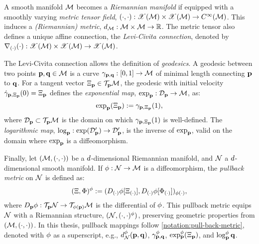 A smooth manifold \(\mathcal{M}\) becomes a \emph{Riemannian manifold} if equipped with a smoothly varying \emph{metric tensor field}, \((\cdot, \cdot): \mathscr{X}(\mathcal{M}) \times \mathscr{X}(\mathcal{M}) \to C^\infty(\mathcal{M})\). This induces a \emph{(Riemannian) metric}, \(d_{\mathcal{M}}: \mathcal{M} \times \mathcal{M} \to \mathbb{R}\). The metric tensor also defines a unique affine connection, the \emph{Levi-Civita connection}, denoted by \(\nabla_{(\cdot)} (\cdot): \mathscr{X}(\mathcal{M}) \times \mathscr{X}(\mathcal{M}) \to \mathscr{X}(\mathcal{M})\).

The Levi-Civita connection allows the definition of \emph{geodesics}. A geodesic between two points \(\mathbf{p}, \mathbf{q} \in \mathcal{M}\) is a curve \(\gamma_{\mathbf{p}, \mathbf{q}}: [0,1] \to \mathcal{M}\) of minimal length connecting \(\mathbf{p}\) to \(\mathbf{q}\). For a tangent vector \(\Xi_{\mathbf{p}} \in \mathcal{T}_{\mathbf{p}} \mathcal{M}\), the geodesic with initial velocity \(\dot{\gamma}_{\mathbf{p}, \Xi_{\mathbf{p}}}(0) = \Xi_{\mathbf{p}}\) defines the \emph{exponential map}, \(\exp_{\mathbf{p}}: \mathcal{D}_{\mathbf{p}} \to \mathcal{M}\), as:
\[
\exp_{\mathbf{p}}(\Xi_{\mathbf{p}}) := \gamma_{\mathbf{p}, \Xi_{\mathbf{p}}}(1),
\]
where \(\mathcal{D}_{\mathbf{p}} \subset \mathcal{T}_{\mathbf{p}} \mathcal{M}\) is the domain on which \(\gamma_{\mathbf{p}, \Xi_{\mathbf{p}}}(1)\) is well-defined. The \emph{logarithmic map}, \(\log_{\mathbf{p}}: \exp(\mathcal{D}'_{\mathbf{p}}) \to \mathcal{D}'_{\mathbf{p}}\), is the inverse of \(\exp_{\mathbf{p}}\), valid on the domain where \(\exp_{\mathbf{p}}\) is a diffeomorphism.

Finally, let \((\mathcal{M}, (\cdot, \cdot))\) be a \(d\)-dimensional Riemannian manifold, and \(\mathcal{N}\) a \(d\)-dimensional smooth manifold. If \(\phi: \mathcal{N} \to \mathcal{M}\) is a diffeomorphism, the \emph{pullback metric} on \(\mathcal{N}\) is defined as:
\begin{equation}
(\Xi, \Phi)^\phi := (D_{(\cdot)} \phi[\Xi_{(\cdot)}], D_{(\cdot)} \phi[\Phi_{(\cdot)}])_{\phi(\cdot)},
\label{notation:pull-back-metric}
\end{equation}
where \(D_{\mathbf{p}} \phi: \mathcal{T}_{\mathbf{p}} \mathcal{N} \to \mathcal{T}_{\phi(\mathbf{p})} \mathcal{M}\) is the differential of \(\phi\). This pullback metric equips \(\mathcal{N}\) with a Riemannian structure, \((\mathcal{N}, (\cdot, \cdot)^\phi)\), preserving geometric properties from \((\mathcal{M}, (\cdot, \cdot))\). In this thesis, pullback mappings follow \ref{notation:pull-back-metric}, denoted with \(\phi\) as a superscript, e.g., \(d^\phi_{\mathcal{N}}(\mathbf{p}, \mathbf{q})\), \(\gamma^\phi_{\mathbf{p}, \mathbf{q}}\), \(\exp^\phi_{\mathbf{p}} (\Xi_{\mathbf{p}})\), and \(\log^\phi_{\mathbf{p}} \mathbf{q}\).
